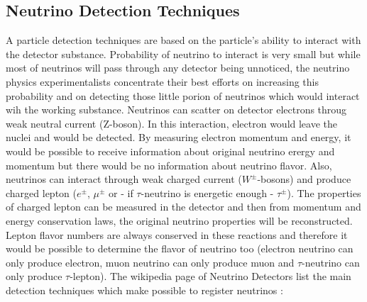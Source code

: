 \subsection{Neutrino Detection Techniques} 
A particle detection techniques are based on the particle's ability to interact with the detector substance. Probability of neutrino to interact is very small but while most of neutrinos will pass through any detector being unnoticed, the neutrino physics experimentalists concentrate their best efforts on increasing this probability and on detecting those little porion of neutrinos which would interact wih the working substance. 
Neutrinos can scatter on detector electrons throug weak neutral current (Z-boson). In this interaction, electron would leave the nuclei and would be detected. By measuring electron momentum and energy, it would be possible to receive information about original neutrino erergy and momentum but there would be no information about neutrino flavor. Also, neutrinos can interact through weak charged current ($W^\pm$-bosons) and produce charged lepton ($e^\pm$, $\mu^\pm$ or - if $\tau$-neutrino is energetic enough - $\tau^\pm$). The properties of charged lepton can be measured in the detector and then from momentum and energy conservation laws, the original neutrino properties will be reconstructed. Lepton flavor numbers are always conserved in these reactions and therefore it would be possible to determine the flavor of neutrino too (electron neutrino can only produce electron, muon neutrino can only produce muon and $\tau$-neutrino can only produce $\tau$-lepton).
The wikipedia page of Neutrino Detectors list the main detection techniques which make possible to register neutrinos \cite{ref_wiki_NeutrinoDetectors}:

